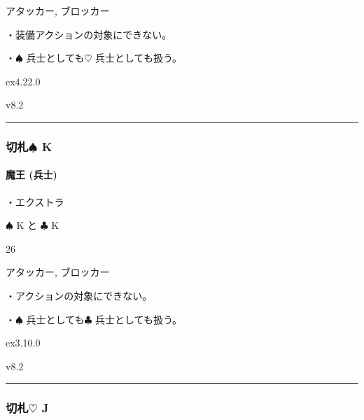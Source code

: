 \documentclass[letterpaper,10pt,dvipdfmx]{sphinxmanual}
\begin{document}
\sphinxAtStartPar
{} アタッカー, ブロッカー

\sphinxAtStartPar
{}

\sphinxAtStartPar
・装備アクションの対象にできない。

\sphinxAtStartPar
・{\normalsize $\spadesuit$} 兵士としても{\normalsize $\heartsuit$} 兵士としても扱う。

\sphinxAtStartPar
{}  ex4.22.0

\sphinxAtStartPar
{}  v8.2


\bigskip\hrule\bigskip



\subsubsection{切札{\normalsize $\spadesuit$} K}
\label{\detokenize{auto/frameActionlist:id89}}

\paragraph{魔王 (兵士)}
\label{\detokenize{auto/frameActionlist:char-darklord}}\label{\detokenize{auto/frameActionlist:id90}}
\sphinxAtStartPar
{}

\sphinxAtStartPar
・エクストラ

\sphinxAtStartPar
{} {\normalsize $\spadesuit$} K と {\normalsize $\clubsuit$} K

\sphinxAtStartPar
{} 26

\sphinxAtStartPar
{} アタッカー, ブロッカー

\sphinxAtStartPar
{}

\sphinxAtStartPar
・アクションの対象にできない。

\sphinxAtStartPar
・{\normalsize $\spadesuit$} 兵士としても{\normalsize $\clubsuit$} 兵士としても扱う。

\sphinxAtStartPar
{}  ex3.10.0

\sphinxAtStartPar
{}  v8.2


\bigskip\hrule\bigskip



\subsubsection{切札{\normalsize $\heartsuit$} J}
\label{\detokenize{auto/frameActionlist:id91}}
\end{document}
